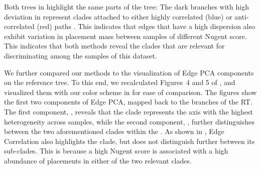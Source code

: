 Both trees in  highlight the same parts of the tree:
The dark branches with high deviation in  represent clades
attached to either highly correlated (blue) or anti-correlated (red) paths .
This indicates that edges that have a high dispersion
also exhibit variation in placement mass between samples of different Nugent score.
This indicates that both methods reveal the clades that are relevant for discriminating among the samples of this dataset.

We further compared our methods to the visualization of Edge PCA components on the reference tree.
To this end, we recalculated Figures~4 and 5 of ,
and visualized them with our color scheme in  for ease of comparison.
The figures show the first two components of Edge PCA, mapped back to the branches of the \ac{RT}.
The first component, ,
reveals that the  clade represents the axis with the highest heterogeneity across samples,
while the second component, ,
further distinguishes between the two aforementioned clades within the .
As shown in , Edge Correlation also highlights the  clade,
but does not distinguish further between its sub-clades.
This is because a high Nugent score is associated
with a high abundance of placements in either of the two relevant  clades.


